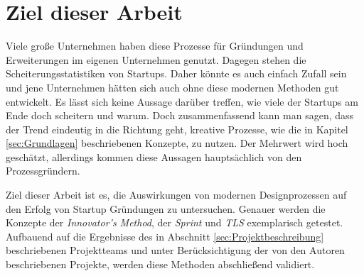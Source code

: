 \section{Ziel dieser Arbeit}
Viele große Unternehmen haben diese Prozesse für Gründungen und Erweiterungen im eigenen Unternehmen genutzt. Dagegen stehen die Scheiterungsstatistiken von Startups. Daher könnte es auch einfach Zufall sein und jene Unternehmen hätten sich auch ohne diese modernen Methoden gut entwickelt. Es lässt sich keine Aussage darüber treffen, wie viele der Startups am Ende doch scheitern und warum. Doch zusammenfassend kann man sagen, dass der Trend eindeutig in die Richtung geht, kreative Prozesse, wie die in Kapitel \ref{sec:Grundlagen} beschriebenen Konzepte, zu nutzen. Der Mehrwert wird hoch geschätzt, allerdings kommen diese Aussagen hauptsächlich von den Prozessgründern.

Ziel dieser Arbeit ist es, die Auswirkungen von modernen Designprozessen auf den Erfolg von Startup Gründungen zu untersuchen. Genauer werden die Konzepte der \textit{Innovator's Method}, der \textit{Sprint} und \textit{\ac{TLS}} exemplarisch getestet. Aufbauend auf die Ergebnisse des in Abschnitt \ref{sec:Projektbeschreibung} beschriebenen Projektteams und unter Berücksichtigung der von den Autoren beschriebenen Projekte, werden diese Methoden abschließend validiert. 